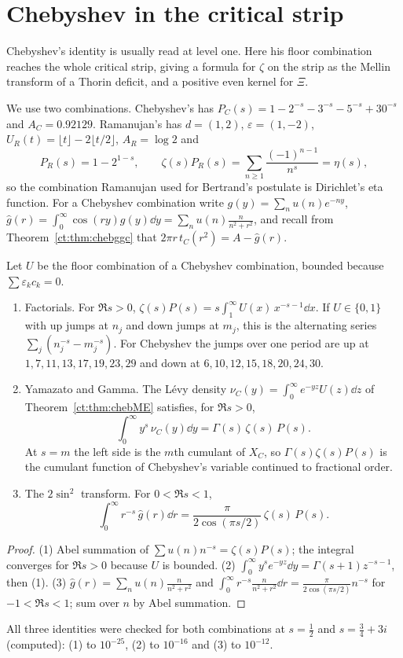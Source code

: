 \section{Chebyshev in the critical strip}\label{ct:sec:strip}

Chebyshev's identity is usually read at level one. Here his floor combination reaches the whole critical strip, giving a formula for $\zeta$ on the strip as the Mellin transform of a Thorin deficit, and a positive even kernel for $\Xi$.

We use two combinations. Chebyshev's has $P_C(s)=1-2^{-s}-3^{-s}-5^{-s}+30^{-s}$ and $A_C=0.92129$. Ramanujan's has $d=(1,2)$, $\varepsilon=(1,-2)$, $U_R(t)=\lfloor t\rfloor-2\lfloor t/2\rfloor$, $A_R=\log2$ and
\[
P_R(s)=1-2^{1-s},\qquad\zeta(s)P_R(s)=\sum_{n\ge1}\frac{(-1)^{n-1}}{n^s}=\eta(s),
\]
so the combination Ramanujan used for Bertrand's postulate is Dirichlet's eta function. For a Chebyshev combination write $g(y)=\sum_nu(n)e^{-ny}$, $\hat g(r)=\int_0^\infty\cos(ry)g(y)\dd y=\sum_nu(n)\frac{n}{n^2+r^2}$, and recall from Theorem~\ref{ct:thm:chebggc} that $2\pi r\,t_C(r^2)=A-\hat g(r)$.

\begin{theorem}\label{ct:thm:strip}
Let $U$ be the floor combination of a Chebyshev combination, bounded because $\sum\varepsilon_kc_k=0$.
\begin{enumerate}
\item Factorials. For $\Re s>0$, $\zeta(s)P(s)=s\int_1^\infty U(x)\,x^{-s-1}\dd x$. If $U\in\{0,1\}$ with up jumps at $n_j$ and down jumps at $m_j$, this is the alternating series $\sum_j(n_j^{-s}-m_j^{-s})$. For Chebyshev the jumps over one period are up at $1,7,11,13,17,19,23,29$ and down at $6,10,12,15,18,20,24,30$.
\item Yamazato and Gamma. The L\'evy density $\nu_C(y)=\int_0^\infty e^{-yz}U(z)\dd z$ of Theorem~\ref{ct:thm:chebME} satisfies, for $\Re s>0$,
\[
\int_0^\infty y^{s}\,\nu_C(y)\dd y=\Gamma(s)\,\zeta(s)\,P(s).
\]
At $s=m$ the left side is the $m$th cumulant of $X_C$, so $\Gamma(s)\zeta(s)P(s)$ is the cumulant function of Chebyshev's variable continued to fractional order.
\item The $2\sin^2$ transform. For $0<\Re s<1$,
\[
\int_0^\infty r^{-s}\,\hat g(r)\dd r=\frac{\pi}{2\cos(\pi s/2)}\,\zeta(s)\,P(s).
\]
\end{enumerate}
\end{theorem}
\begin{proof}
(1) Abel summation of $\sum u(n)n^{-s}=\zeta(s)P(s)$; the integral converges for $\Re s>0$ because $U$ is bounded. (2) $\int_0^\infty y^se^{-yz}\dd y=\Gamma(s+1)z^{-s-1}$, then (1). (3) $\hat g(r)=\sum_nu(n)\frac n{n^2+r^2}$ and $\int_0^\infty r^{-s}\frac{n}{n^2+r^2}\dd r=\frac{\pi}{2\cos(\pi s/2)}n^{-s}$ for $-1<\Re s<1$; sum over $n$ by Abel summation.
\end{proof}
All three identities were checked for both combinations at $s=\frac12$ and $s=\frac34+3i$ (computed): (1) to $10^{-25}$, (2) to $10^{-16}$ and (3) to $10^{-12}$.


